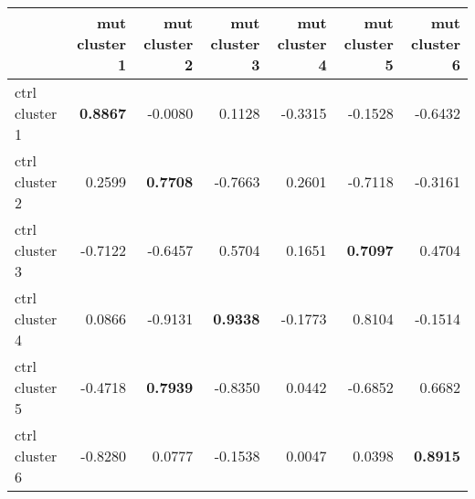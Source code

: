 \begin{tabular}{l|rrrrrr}
 & mut cluster 1 & mut cluster 2 & mut cluster 3 & mut cluster 4 & mut cluster 5 & mut cluster 6 \\
\hline
ctrl cluster 1 & \cellcolor{lightgray} \bfseries 0.8867 & -0.0080 & 0.1128 & -0.3315 & -0.1528 & -0.6432 \\
ctrl cluster 2 & 0.2599 & \cellcolor{lightgray} \bfseries 0.7708 & -0.7663 & 0.2601 & -0.7118 & -0.3161 \\
ctrl cluster 3 & -0.7122 & -0.6457 & 0.5704 & 0.1651 & \cellcolor{lightgray} \bfseries 0.7097 & 0.4704 \\
ctrl cluster 4 & 0.0866 & -0.9131 & \cellcolor{lightgray} \bfseries 0.9338 & -0.1773 & 0.8104 & -0.1514 \\
ctrl cluster 5 & -0.4718 & \cellcolor{lightgray} \bfseries 0.7939 & -0.8350 & 0.0442 & -0.6852 & 0.6682 \\
ctrl cluster 6 & -0.8280 & 0.0777 & -0.1538 & 0.0047 & 0.0398 & \cellcolor{lightgray} \bfseries 0.8915 \\
\end{tabular}
